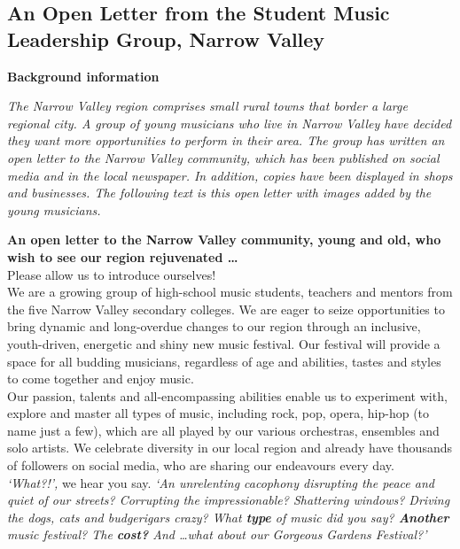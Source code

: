 \documentclass[a4paper]{article}
\begin{document}
\newpage
\subsection{An Open Letter from the Student Music Leadership Group, Narrow Valley}

\textbf{Background information}

\textit{The Narrow Valley region comprises small rural towns that border a large regional city. A group of young musicians who live in Narrow Valley have decided they want more opportunities to perform in their area. The group has written an open letter to the Narrow Valley community, which has been published on social media and in the local newspaper. In addition, copies have been displayed in shops and businesses. The following text is this open letter with images added by the young musicians.}\\

\medskip

\textbf{An open letter to the Narrow Valley community, young and old, who wish to see our region rejuvenated \ldots}\\

Please allow us to introduce ourselves!\\

We are a growing group of high-school music students, teachers and mentors from the five Narrow Valley secondary colleges. We are eager to seize opportunities to bring dynamic and long-overdue changes to our region through an inclusive, youth-driven, energetic and shiny new music festival. Our festival will provide a space for all budding musicians, regardless of age and abilities, tastes and styles to come together and enjoy music.\\

Our passion, talents and all-encompassing abilities enable us to experiment with, explore and master all types of music, including rock, pop, opera, hip-hop (to name just a few), which are all played by our various orchestras, ensembles and solo artists. We celebrate diversity in our local region and already have thousands of followers on social media, who are sharing our endeavours every day.\\

\textit{‘What?!’,} we hear you say. \textit{‘An unrelenting cacophony disrupting the peace and quiet of our streets? Corrupting the impressionable? Shattering windows? Driving the dogs, cats and budgerigars crazy? What \textbf{type} of music did you say? \textbf{Another} music festival? The \textbf{cost?} And \ldots what about our Gorgeous Gardens Festival?’}\\
\end{document}
